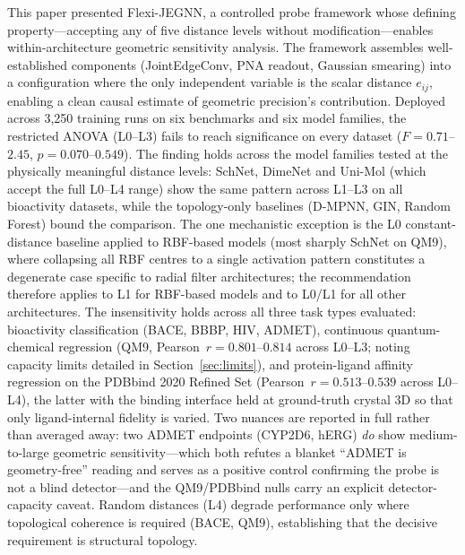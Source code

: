 \documentclass[pdflatex,sn-vancouver-num]{sn-jnl}%
\theoremstyle{thmstyleone}%
\theoremstyle{thmstyletwo}%
\theoremstyle{thmstylethree}%
\begin{document}
This paper presented Flexi-JEGNN, a controlled probe framework whose defining
property---accepting any of five distance levels without
modification---enables within-architecture geometric sensitivity analysis.  The framework assembles
well-established components (JointEdgeConv, PNA readout, Gaussian smearing)
into a configuration where the only independent variable is the scalar
distance $e_{ij}$, enabling a clean causal estimate of geometric precision's
contribution.  Deployed across 3,250
training runs on six benchmarks and six model families, the restricted
ANOVA (L0--L3) fails to reach significance on every dataset
($F = 0.71$--$2.45$, $p = 0.070$--$0.549$).  The finding holds
across the model families tested at the physically meaningful distance levels: SchNet, DimeNet and Uni-Mol (which accept the full L0--L4 range) show the same pattern across L1--L3 on
all bioactivity datasets, while the topology-only baselines (D-MPNN, GIN, Random Forest) bound the comparison.  The one mechanistic exception is the L0 constant-distance
baseline applied to RBF-based models (most sharply SchNet on QM9), where collapsing all RBF centres to a
single activation pattern constitutes a degenerate case specific to radial
filter architectures; the recommendation therefore applies to L1
for RBF-based models and to L0/L1 for all other architectures.  The
insensitivity holds across all three task types evaluated: bioactivity
classification (BACE, BBBP, HIV, ADMET), continuous quantum-chemical
regression (QM9, Pearson~$r = 0.801$--$0.814$ across L0--L3; noting capacity limits detailed in Section~\ref{sec:limits}), and protein-ligand affinity regression on the PDBbind 2020 Refined Set
(Pearson~$r = 0.513$--$0.539$ across L0--L4), the latter with the binding interface held at ground-truth crystal 3D so that only ligand-internal fidelity is varied.  Two nuances are reported in full rather than averaged away: two ADMET endpoints (CYP2D6, hERG) \emph{do} show medium-to-large geometric sensitivity---which both refutes a blanket ``ADMET is geometry-free'' reading and serves as a positive control confirming the probe is not a blind detector---and the QM9/PDBbind nulls carry an explicit detector-capacity caveat.  Random distances (L4) degrade
performance only where topological coherence is required (BACE, QM9),
establishing that the decisive requirement is structural topology.
\end{document}

